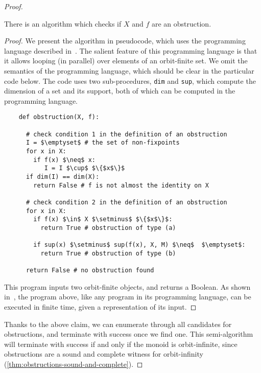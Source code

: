 \begin{proof}
    \begin{claim}
        There is an algorithm which checks if $X$ and $f$ are an obstruction.
    \end{claim}
    \begin{proof}
        We present the algorithm in  pseudocode, which uses the programming language described in~\cite[Section 11]{bojanczyk_slightly2018}. The salient feature of this programming language is that it allows looping (in parallel) over elements of an orbit-finite set. We omit the semantics of the programming language, which should be clear in the particular code below.   The code uses two sub-procedures, 
    \texttt{dim} and \texttt{sup}, which compute the dimension of a set and its support, both of which can be computed in the programming language.
        \begin{lstlisting}
	def obstruction(X, f):

	  # check condition 1 in the definition of an obstruction
      I = $\emptyset$ # the set of non-fixpoints
      for x in X:
        if f(x) $\neq$ x:
           I = I $\cup$ $\{$x$\}$
      if dim(I) == dim(X): 
        return False # f is not almost the identity on X

      # check condition 2 in the definition of an obstruction
      for x in X: 
        if f(x) $\in$ X $\setminus$ $\{$x$\}$:
          return True # obstruction of type (a)

        if sup(x) $\setminus$ sup(f(x), X, M) $\neq$  $\emptyset$:
          return True # obstruction of type (b)
    
      return False # no obstruction found
        \end{lstlisting}
    This program inputs two orbit-finite objects, and returns a Boolean.
    As shown in~\cite[Theorem 11.2]{bojanczyk_slightly2018}, the program above, like any program in its programming language, can be executed in finite time, given a representation of its input. 		
    \end{proof}

    Thanks to the above claim, we can enumerate through all candidates for obstructions, and terminate with success once we find one. This semi-algorithm will terminate with success if and only if the monoid is orbit-infinite, since obstructions are a sound and complete witness for orbit-infinity (\cref{thm:obstructions-sound-and-complete}).
\end{proof}


